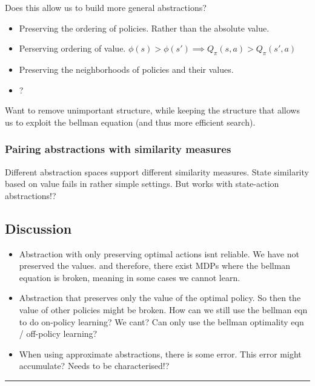Does this allow us to build more general abstractions?

\begin{itemize}
\tightlist
  \item Preserving the ordering of policies. Rather than the absolute value.
  \item Perserving ordering of value. $\phi(s) > \phi(s') \implies Q_{\pi}(s, a) > Q_{\pi}(s', a)$
  \item Preserving the neighborhoods of policies and their values.
  \item ?
\end{itemize}

Want to remove unimportant structure, while keeping the structure that allows us
to exploit the bellman equation (and thus more efficient search).

\subsubsection{Pairing abstractions with similarity measures}

Different abstraction spaces support different similarity measures.
State similarity based on value fails in rather simple settings.
But works with state-action abstractions!?


\subsection{Discussion}



\begin{itemize}
  \item Abstraction with only preserving optimal actions isnt reliable. We have not preserved the values.
  and therefore, there exist MDPs where the bellman equation is broken, meaning in some cases we cannot learn.
  \item Abstraction that preserves only the value of the optimal policy. So then the value of other policies might be broken.
  How can we still use the bellman eqn to do on-policy learning? We cant? Can only use the bellman optimality eqn / off-policy learning?
  \item When using approximate abstractions, there is some error. This error might accumulate? Needs to be characterised!?
\end{itemize}


\begin{center}\rule{0.5\linewidth}{\linethickness}\end{center}

